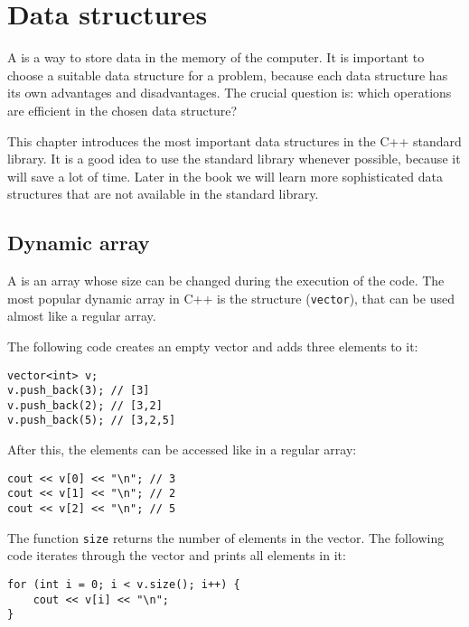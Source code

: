 \chapter{Data structures}


A  is a way to store
data in the memory of the computer.
It is important to choose a suitable
data structure for a problem,
because each data structure has its own
advantages and disadvantages.
The crucial question is: which operations
are efficient in the chosen data structure?

This chapter introduces the most important
data structures in the C++ standard library.
It is a good idea to use the standard library
whenever possible,
because it will save a lot of time.
Later in the book we will learn more sophisticated
data structures that are not available
in the standard library.

\section{Dynamic array}


A  is an array whose
size can be changed during the execution
of the code.
The most popular dynamic array in C++ is
the  structure (\texttt{vector}),
that can be used almost like a regular array.

The following code creates an empty vector and
adds three elements to it:

\begin{lstlisting}
vector<int> v;
v.push_back(3); // [3]
v.push_back(2); // [3,2]
v.push_back(5); // [3,2,5]
\end{lstlisting}

After this, the elements can be accessed like in a regular array:

\begin{lstlisting}
cout << v[0] << "\n"; // 3
cout << v[1] << "\n"; // 2
cout << v[2] << "\n"; // 5
\end{lstlisting}

The function \texttt{size} returns the number of elements in the vector.
The following code iterates through
the vector and prints all elements in it:

\begin{lstlisting}
for (int i = 0; i < v.size(); i++) {
    cout << v[i] << "\n";
}
\end{lstlisting}

